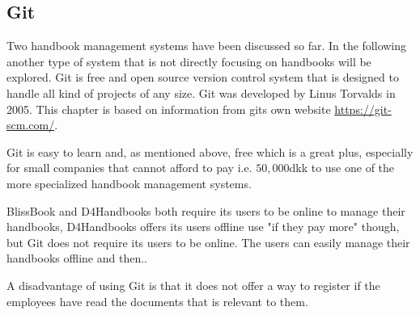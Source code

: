 \subsection{Git}
Two handbook management systems have been discussed so far. In the following another type of system that is not directly focusing on handbooks will be explored. Git is free and open source version control system that is designed to handle all kind of projects of any size. Git was developed by Linus Torvalds in 2005. This chapter is based on information from gits own website \url{https://git-scm.com/}.

Git is easy to learn and, as mentioned above, free which is a great plus, especially for small companies that cannot afford to pay i.e. $50,000$dkk to use one of the more specialized handbook management systems.

BlissBook and D4Handbooks both require its users to be online to manage their handbooks, D4Handbooks offers its users offline use "if they pay more" though, but Git does not require its users to be online. The users can easily manage their handbooks offline and then.. %

A disadvantage of using Git is that it does not offer a way to register if the employees have read the documents that is relevant to them.

